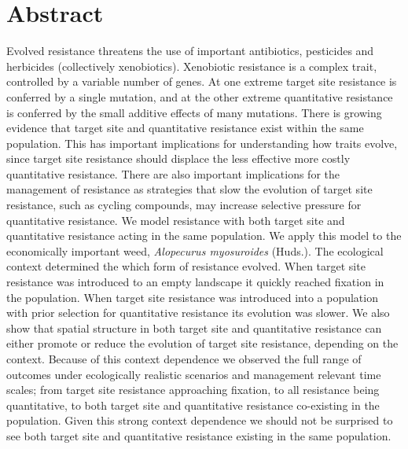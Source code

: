 \documentclass[10pt,letterpaper]{article}
\begin{document}
\section*{Abstract}
Evolved resistance threatens the use of important antibiotics, pesticides and herbicides (collectively xenobiotics). Xenobiotic resistance is a complex trait, controlled by a variable number of genes. At one extreme target site resistance is conferred by a single mutation, and at the other extreme quantitative resistance is conferred by the small additive effects of many mutations. There is growing evidence that target site and quantitative resistance exist within the same population. This has important implications for understanding how traits evolve, since target site resistance should displace the less effective more costly quantitative resistance. There are also important implications for the management of resistance as strategies that slow the evolution of target site resistance, such as cycling compounds, may increase selective pressure for quantitative resistance. We model resistance with both target site and quantitative resistance acting in the same population. We apply this model to the economically important weed, \textit{Alopecurus myosuroides} (Huds.). The ecological context determined the which form of resistance evolved. When target site resistance was introduced to an empty landscape it quickly reached fixation in the population. When target site resistance was introduced into a population with prior selection for quantitative resistance its evolution was slower. We also show that spatial structure in both target site and quantitative resistance can either promote or reduce the evolution of target site resistance, depending on the context. Because of this context dependence we observed the full range of outcomes under ecologically realistic scenarios and management relevant time scales; from target site resistance approaching fixation, to all resistance being quantitative, to both target site and quantitative resistance co-existing in the population. Given this strong context dependence we should not be surprised to see both target site and quantitative resistance existing in the same population.     

\end{document}
